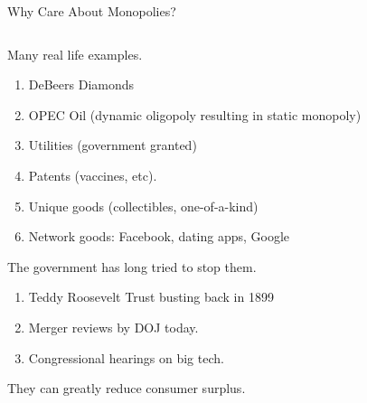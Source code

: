 \documentclass[aspectratio=169]{beamer}
\newenvironment{wideitemize}{\itemize\addtolength{\itemsep}{10pt}}{\enditemize}
\begin{document}
\begin{frame}{Why Care About Monopolies?}
    \begin{columns}[T] %
\begin{column}{.63\textwidth}
\begin{wideitemize}
        \item Many real life examples.
        \begin{enumerate}
            \item DeBeers Diamonds
            \item OPEC Oil (dynamic oligopoly resulting in static monopoly) 
            \item Utilities (government granted)
            \item Patents (vaccines, etc).
            \item Unique goods (collectibles, one-of-a-kind)
            \item Network goods: Facebook, dating apps, Google
        \end{enumerate}
        \item The government has long tried to stop them.
        \begin{enumerate}
            \item Teddy Roosevelt Trust busting back in 1899
            \item Merger reviews by DOJ today.
            \item Congressional hearings on big tech.
        \end{enumerate}
        \item They can greatly reduce consumer surplus.
\end{wideitemize}
\end{column}%
\hfill%
\begin{column}{.34\textwidth}
\resizebox{\textwidth}{!}{
}
\end{column}
\end{columns}
\end{frame}
\end{document}
